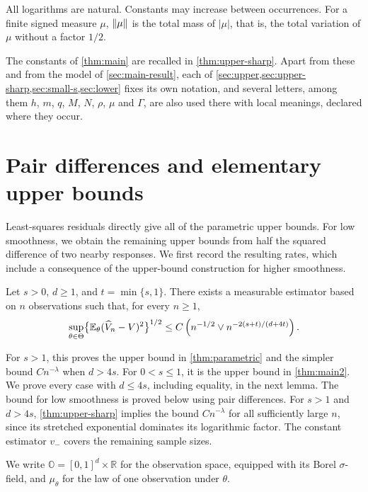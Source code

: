 All logarithms are natural. Constants may increase between occurrences.
For a finite signed measure $\mu$, $\lVert\mu\rVert$ is the total mass of
$|\mu|$, that is, the total variation of $\mu$ without a factor $1/2$.

The constants of \cref{thm:main} are recalled in
\cref{thm:upper-sharp}. Apart from these and from the
model of \cref{sec:main-result}, each of
\cref{sec:upper,sec:upper-sharp,sec:small-s,sec:lower}
fixes its own notation, and several letters, among them $h$, $m$, $q$,
$M$, $N$, $\rho$, $\mu$ and $\Gamma$, are also used there
with local meanings, declared where they occur.

\chapter{Pair differences and elementary upper bounds}
\label{sec:upper}
Least-squares residuals directly give all of the parametric upper
bounds. For low smoothness, we obtain the remaining upper bounds from
half the squared difference of two nearby responses. We first record
the resulting rates, which include a consequence of the upper-bound
construction for higher smoothness.

\begin{proposition}\label{prop:elementary-upper}
Let $s>0$, $d\ge1$, and $t=\min\{s,1\}$. There exists a measurable
estimator based on $n$ observations such that, for every $n\ge1$,
\begin{equation}\label{eq:upper-simple}
 \sup_{\theta\in\Theta}
 \bigl\{\mathbb E_\theta(\widehat V_n-V)^2\bigr\}^{1/2}
 \le C\left(n^{-1/2}\vee n^{-2(s+t)/(d+4t)}\right).
\end{equation}
\end{proposition}

For $s>1$, this proves the upper bound in \cref{thm:parametric}
and the simpler bound $Cn^{-\lambda}$ when $d>4s$. For $0<s\le1$, it
is the upper bound in \cref{thm:main2}.
We prove every case with $d\le4s$, including equality, in the next
lemma. The bound for low smoothness is proved below using pair
differences. For $s>1$ and $d>4s$, \cref{thm:upper-sharp} implies the
bound $Cn^{-\lambda}$ for all sufficiently large $n$, since its
stretched exponential dominates its logarithmic factor. The constant
estimator $v_-$ covers the remaining sample sizes.

We write $\mathbb O=[0,1]^d\times\mathbb R$ for the observation
space, equipped with its Borel $\sigma$-field, and $\mu_\theta$ for the
law of one observation under $\theta$.


